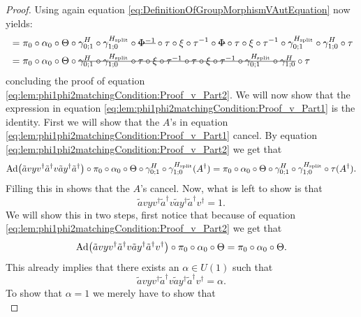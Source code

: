\documentclass[12pt,a4paper,twoside]{article}
\newcommand{\stkout}[1]{\ifmmode\text{\sout{\ensuremath{#1}}}\else\sout{#1}\fi}
\let\originalleft\left
\let\originalright\right
\renewcommand{\left}{\mathopen{}\mathclose\bgroup\originalleft}
\renewcommand{\right}{\aftergroup\egroup\originalright}
\newcommand{\Ad}[1]{\textrm{Ad}\left(#1\right)}
\theoremstyle{definition}
\numberwithin{equation}{section}
\begin{document}
\begin{proof}
	Using again equation \eqref{eq:DefinitionOfGroupMorphismVAutEquation} now yields:
	\begin{align}
	&=\pi_0\circ\alpha_0\circ\Theta\circ\gamma^{H}_{0;1}\circ\gamma^{H_{\text{split}}}_{1;0}\circ\stkout{\Phi^{-1}}\circ\tau\circ\xi\circ\tau^{-1}\circ\stkout{\Phi}\circ\tau\circ\xi\circ\tau^{-1}\circ\gamma^{H_{\text{split}}}_{0;1}\circ\gamma^H_{1;0}\circ\tau\\
	&=\pi_0\circ\alpha_0\circ\Theta\circ\stkout{\gamma^{H}_{0;1}\circ\gamma^{H_{\text{split}}}_{1;0}\circ\tau\circ\xi\circ\tau^{-1}\circ\tau\circ\xi\circ\tau^{-1}\circ\gamma^{H_{\text{split}}}_{0;1}\circ\gamma^H_{1;0}}\circ\tau
	\end{align}
	concluding the proof of equation \eqref{eq:lem:phi1phi2matchingCondition:Proof_v_Part2}. We will now show that the expression in equation \eqref{eq:lem:phi1phi2matchingCondition:Proof_v_Part1} is the identity. First we will show that the $A$'s in equation \eqref{eq:lem:phi1phi2matchingCondition:Proof_v_Part1} cancel. By equation \eqref{eq:lem:phi1phi2matchingCondition:Proof_v_Part2} we get that
	\begin{equation}
		\Ad{\tilde{a}vyv^\dagger\tilde{a}^\dagger v\tilde{a}y^\dagger\tilde{a}^\dagger}\circ\pi_0\circ\alpha_0\circ\Theta\circ\gamma^{H}_{0;1}\circ\gamma^{H_{\text{split}}}_{1;0}(A^\dagger)=\pi_0\circ\alpha_0\circ\Theta\circ\gamma^{H}_{0;1}\circ\gamma^{H_{\text{split}}}_{1;0}\circ\tau(A^\dagger).
	\end{equation}
	Filling this in shows that the $A$'s cancel. Now, what is left to show is that
	\begin{equation}
		\tilde{a}vyv^\dagger\tilde{a}^\dagger v \tilde{a}y^\dagger\tilde{a}^\dagger  v^\dagger=1.
	\end{equation}
	We will show this in two steps, first notice that because of equation \eqref{eq:lem:phi1phi2matchingCondition:Proof_v_Part2} we get that
	\begin{equation}
	\Ad{\tilde{a}vyv^\dagger\tilde{a}^\dagger v \tilde{a}y^\dagger\tilde{a}^\dagger  v^\dagger}\circ\pi_0\circ\alpha_0\circ\Theta=\pi_0\circ\alpha_0\circ\Theta.
	\end{equation}
	This already implies that there exists an $\alpha\in U(1)$ such that
	\begin{equation}
	\tilde{a}vyv^\dagger\tilde{a}^\dagger v \tilde{a}y^\dagger\tilde{a}^\dagger  v^\dagger=\alpha.
	\end{equation}
	To show that $\alpha=1$ we merely have to show that
	\begin{equation}

\end{equation}
\end{proof}
\end{document}
